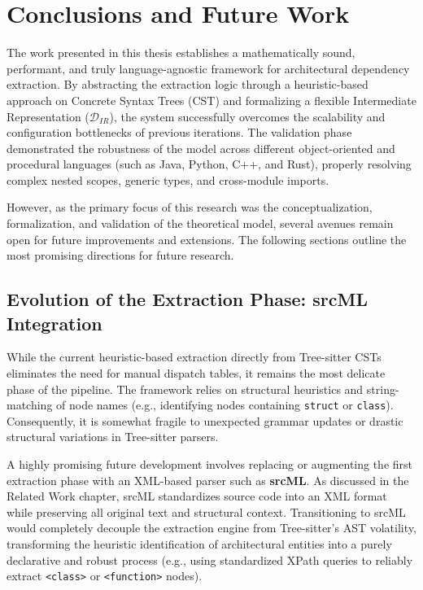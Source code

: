 \chapter{Conclusions and Future Work}
\label{ch:future_work}

The work presented in this thesis establishes a mathematically sound,
performant, and truly language-agnostic framework for architectural
dependency extraction. By abstracting the extraction logic through a
heuristic-based approach on Concrete Syntax Trees (CST) and
formalizing a flexible Intermediate Representation
($\mathcal{D}_{IR}$), the system successfully overcomes the
scalability and configuration bottlenecks of previous iterations. The
validation phase demonstrated the robustness of the model across
different object-oriented and procedural languages (such as Java,
Python, C++, and Rust), properly resolving complex nested scopes,
generic types, and cross-module imports.

However, as the primary focus of this research was the
conceptualization, formalization, and validation of the theoretical
model, several avenues remain open for future improvements and
extensions. The following sections outline the most promising
directions for future research.

\section{Evolution of the Extraction Phase: srcML Integration}

While the current heuristic-based extraction directly from
Tree-sitter CSTs eliminates the need for manual dispatch tables, it
remains the most delicate phase of the pipeline. The framework relies
on structural heuristics and string-matching of node names (e.g.,
identifying nodes containing \texttt{struct} or \texttt{class}).
Consequently, it is somewhat fragile to unexpected grammar updates or
drastic structural variations in Tree-sitter parsers.

A highly promising future development involves replacing or
augmenting the first extraction phase with an XML-based parser such
as \textbf{srcML}. As discussed in the Related Work chapter, srcML
standardizes source code into an XML format while preserving all
original text and structural context. Transitioning to srcML would
completely decouple the extraction engine from Tree-sitter's AST
volatility, transforming the heuristic identification of
architectural entities into a purely declarative and robust process
(e.g., using standardized XPath queries to reliably extract
\texttt{<class>} or \texttt{<function>} nodes).

